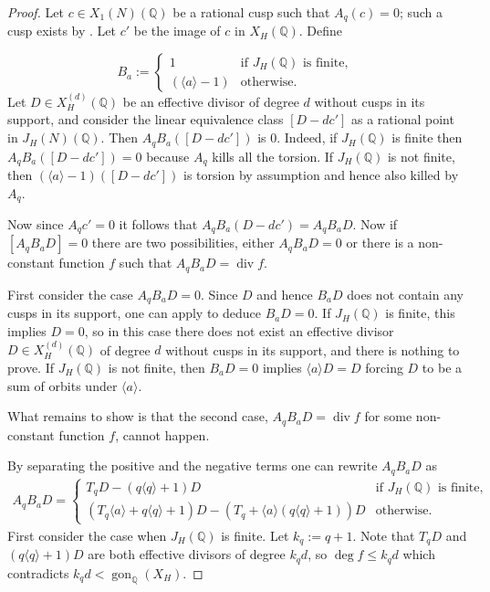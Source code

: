 \documentclass[10pt,a4paper]{amsart}
\DeclareMathOperator{\ddiv}{div}
\DeclareMathOperator{\gon}{gon}
\newcommand{\Q}{\mathbb{Q}}
\newcommand{\diamondop}[1]{\langle #1 \rangle} %
\begin{document}
\begin{proof}
Let $c \in X_1(N)(\Q)$ be a rational cusp such that $A_q(c) = 0$; such a cusp exists by .  Let $c'$ be the image of $c$ in $X_H(\Q)$. Define 

\[ B_{a} :=\begin{cases}
           1 & \text{if $J_H(\Q)$ is finite, } \\
           (\diamondop{a}-1) & \text{otherwise.}
         \end{cases}
         \]
Let $D \in X_H^{(d)}(\Q)$ be an effective divisor of degree $d$ without cusps in its support, and consider the linear equivalence class $[D-dc']$ as a rational point in $J_H(N)(\Q)$. Then $A_qB_{a}([D-dc'])$ is $0$. Indeed, if $J_H(\Q)$ is finite then $A_qB_{a}([D-dc'])=0$ because $A_q$ kills all the torsion. If $J_H(\Q)$ is not finite, then $(\diamondop{a}-1)([D-dc'])$ is torsion by assumption and hence also killed by $A_q$.

Now since $A_qc' =0$ it follows that $A_qB_{a}(D-dc')=A_qB_{a}D$.
Now if $[A_qB_{a}D]=0$ there are two possibilities, either $A_qB_{a}D=0$ or there is a non-constant function $f$ such that $A_qB_{a}D = \ddiv f$.

First consider the case $A_qB_{a}D=0$. Since $D$ and hence $B_{a}D$ does not contain any cusps in its support, one can apply  to deduce $B_{a}D=0$. If $J_H(\Q)$ is finite, this implies $D=0$, so in this case there does not exist an effective divisor $D \in X_H^{(d)}(\Q)$ of degree $d$ without cusps in its support, and there is nothing to prove. If $J_H(\Q)$ is not finite, then $B_{a}D=0$ implies $\diamondop a D =D$ forcing $D$ to be a sum of orbits under $\diamondop a$.

What remains to show is that the second case, $A_qB_{a}D = \ddiv f$ for some non-constant function $f$, cannot happen.

By separating the positive and the negative terms one can rewrite $A_qB_{a}D$ as \begin{align}A_qB_{a}D=\begin{cases}
           T_qD - (q\diamondop{q}+1)D  & \text{if $J_H(\Q)$ is finite, } \\
           (T_q\diamondop{a}+q\diamondop{q}+1)D - (T_q +\diamondop{a}(q\diamondop{q}+1))D & \text{otherwise}. 
         \end{cases}\label{eq:linear-equivalence}\end{align}
First consider the case when $J_H(\Q)$ is finite. Let $k_q:=q+1$. Note that $T_qD$  and $(q\diamondop{q}+1)D$ are both effective divisors of degree $k_qd$, so $\deg f \leq k_qd$ which contradicts $k_qd < \gon_\Q(X_H).$


\end{proof}
\end{document}
